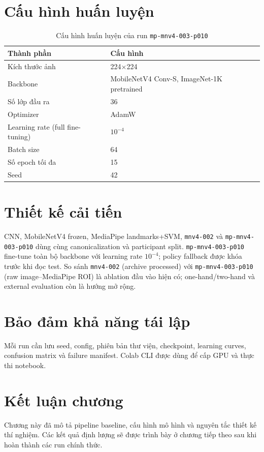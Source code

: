 \section{Cấu hình huấn luyện}
\begin{table}[ht]
\centering
\caption{Cấu hình huấn luyện của run \texttt{mp-mnv4-003-p010}}
\label{tab:training-config}
\begin{tabular}{ll}
\toprule
Thành phần & Cấu hình\\
\midrule
Kích thước ảnh & 224$\times$224\\
Backbone & MobileNetV4 Conv-S, ImageNet-1K pretrained\\
Số lớp đầu ra & 36\\
Optimizer & AdamW\\
Learning rate (full fine-tuning) & $10^{-4}$\\
Batch size & 64\\
Số epoch tối đa & 15\\
Seed & 42\\
\bottomrule
\end{tabular}
\end{table}

\section{Thiết kế cải tiến}
CNN, MobileNetV4 frozen, MediaPipe landmarks+SVM, \texttt{mnv4-002} và \texttt{mp-mnv4-003-p010} dùng cùng canonicalization và participant split. \texttt{mp-mnv4-003-p010} fine-tune toàn bộ backbone với learning rate $10^{-4}$; policy fallback được khóa trước khi đọc test. So sánh \texttt{mnv4-002} (archive processed) với \texttt{mp-mnv4-003-p010} (raw image--MediaPipe ROI) là ablation đầu vào hiện có; one-hand/two-hand và external evaluation còn là hướng mở rộng.

\section{Bảo đảm khả năng tái lập}
Mỗi run cần lưu seed, config, phiên bản thư viện, checkpoint, learning curves, confusion matrix và failure manifest. Colab CLI được dùng để cấp GPU và thực thi notebook.

\section{Kết luận chương}
Chương này đã mô tả pipeline baseline, cấu hình mô hình và nguyên tắc thiết kế thí nghiệm. Các kết quả định lượng sẽ được trình bày ở chương tiếp theo sau khi hoàn thành các run chính thức.
